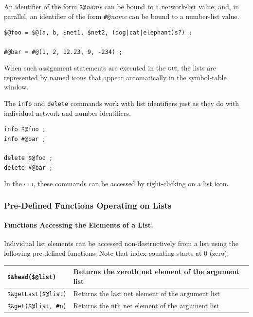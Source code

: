 \documentclass[letterpaper,12pt]{article}
\newcommand{\acro}{\textsc}
\begin{document}
\noindent
An identifier of the form \verb!$@!\emph{name} can be bound to a
network-list value; and, in parallel, an identifier of the form
\verb!#@!\emph{name} can be bound to a number-list value.

\begin{Verbatim}[fontsize=\small]
$@foo = $@(a, b, $net1, $net2, (dog|cat|elephant)s?) ;

#@bar = #@(1, 2, 12.23, 9, -234) ;
\end{Verbatim}

\noindent
When such assignment statements are executed in the \acro{gui}, the lists are
represented by named icons that appear automatically in the symbol-table window.

The \texttt{info} and \texttt{delete} commands work with list identifiers
just as they do with individual network and number identifiers.

\begin{Verbatim}[fontsize=\small]
info $@foo ;
info #@bar ;

delete $@foo ;
delete #@bar ;
\end{Verbatim}

\noindent
In the \acro{gui}, these commands can be accessed by right-clicking on a list
icon.

\subsubsection{Pre-Defined Functions Operating on Lists}

\paragraph{Functions Accessing the Elements of a List.} 
Individual list
elements can be accessed non-destructively from a list using the
following pre-defined functions.  Note that index counting starts at 0
(zero).

\vspace{.5cm}

\noindent
\begin{tabular}{|l|l|}
\hline
\verb!$&head($@list)! & Returns the zeroth net element of the argument list\\
\hline
\verb!$&getLast($@list)! & Returns the last net element of the argument list\\
\hline
\verb!$&get($@list, #n)! & Returns the nth net element of the argument list\\
\hline
\end{tabular}
\end{document}
